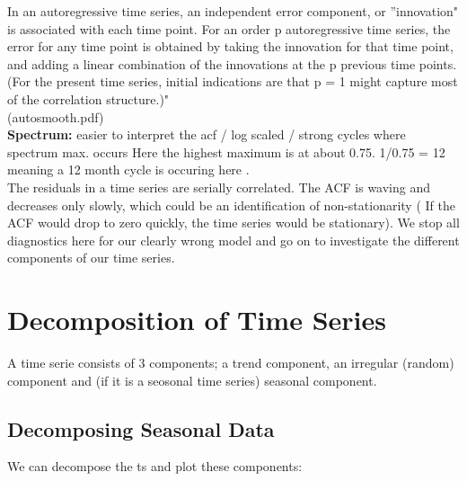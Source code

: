 \documentclass[11pt, a4paper]{article} %
\begin{document}
\noindent In an autoregressive time series, an independent error component, or ''innovation" is associated with each time point. For an order p autoregressive time series, the error for any time point is obtained by taking the innovation for that time point, and adding a linear combination of the innovations at the p previous time points. (For the present time series, initial indications are that p = 1 might capture most of the correlation structure.)"\\ (autosmooth.pdf)\\

\noindent \textbf{Spectrum:} easier to interpret the acf / log scaled / strong cycles where spectrum max. occurs 
Here the highest maximum is at about 0.75. 1/0.75 = 12 meaning a 12 month cycle is occuring here .\\

\noindent The residuals in a time series are serially correlated. The ACF is waving and decreases only slowly, which could be an identification of non-stationarity ( If the ACF would drop to zero quickly, the time series would be stationary). We stop all diagnostics here for our clearly wrong model and go on to investigate the different components of our time series.\\


\section{Decomposition of Time Series}%
A time serie consists of 3 components; a trend component, an irregular (random) component and (if it is a seosonal time series) seasonal component.

\subsection{Decomposing Seasonal Data}%

\noindent We can decompose the ts and plot these components:
\end{document}
